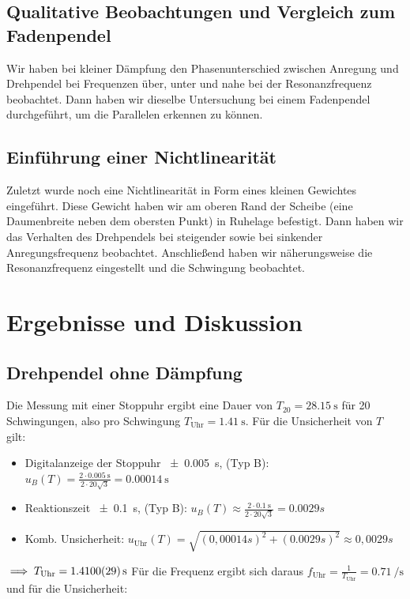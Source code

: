 \documentclass[
	a4paper,
	12pt,
	pagesize,
	ngerman
]{scrartcl}
\begin{document}
	\subsection{Qualitative Beobachtungen und Vergleich zum Fadenpendel}
	Wir haben bei kleiner Dämpfung den Phasenunterschied zwischen Anregung und Drehpendel bei Frequenzen über, unter und nahe bei der Resonanzfrequenz beobachtet. Dann haben wir dieselbe Untersuchung bei einem Fadenpendel durchgeführt, um die Parallelen erkennen zu können.
	\subsection{Einführung einer Nichtlinearität}
	Zuletzt wurde noch eine Nichtlinearität in Form eines kleinen Gewichtes eingeführt. Diese Gewicht haben wir am oberen Rand der Scheibe (eine Daumenbreite neben dem obersten Punkt) in Ruhelage befestigt. Dann haben wir das Verhalten des Drehpendels bei steigender sowie bei sinkender Anregungsfrequenz beobachtet. Anschließend haben wir näherungsweise die Resonanzfrequenz eingestellt und die Schwingung beobachtet.
	
	\section{Ergebnisse und Diskussion}
	
	\subsection{Drehpendel ohne Dämpfung}
	Die Messung mit einer Stoppuhr ergibt eine Dauer von $T_{20} =\SI{28,15}{\second}$ für 20 Schwingungen, also pro Schwingung $ T_\text{Uhr} = \SI{1,41}{\second}$. %
	Für die Unsicherheit von \(T\) gilt: \\
	\begin{itemize}
		\item  Digitalanzeige der Stoppuhr \SI{\pm 0,005}{\second}, (Typ B): \( u_B(T) = \frac{2\cdot \SI{0,005}{\second}}{2 \cdot 20 \sqrt{3}} = \SI{0,00014}{\second} \)
		\item Reaktionszeit \SI{\pm 0,1}{\second}, (Typ B): \( u_B(T) \approx \frac{2\cdot \SI{0,1}{\second}}{2 \cdot 20 \sqrt{3}} = 0.0029\si{s} \)
		\item Komb. Unsicherheit: $ u_\text{Uhr}(T) = \sqrt{(0,00014\si{s})^2+(0.0029\si{s})^2} \approx 0,0029 \si{s} $
	\end{itemize} 
	$ \implies T_\text{Uhr} = \SI{1,41 \pm 0,0029}{\second} $ \newline 
	Für die Frequenz ergibt sich daraus $ f_\text{Uhr} = \frac{1}{T_\text{Uhr}} = \SI{0,71}{\per \second}$ und für die Unsicherheit: \newline
	
\end{document}
